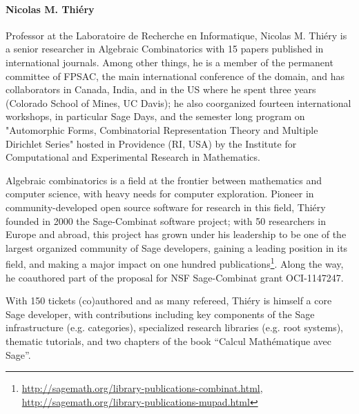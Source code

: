 \paragraph{Nicolas M. Thiéry}

Professor at the Laboratoire de Recherche en Informatique, Nicolas
M. Thiéry is a senior researcher in Algebraic Combinatorics with 15
papers published in international journals. Among other things, he is
a member of the permanent committee of FPSAC, the main international
conference of the domain, and has collaborators in Canada, India, and
in the US where he spent three years (Colorado School of Mines, UC
Davis); he also coorganized fourteen international workshops, in
particular Sage Days, and the semester long program on "Automorphic
Forms, Combinatorial Representation Theory and Multiple Dirichlet
Series" hosted in Providence (RI, USA) by the Institute for
Computational and Experimental Research in Mathematics.

Algebraic combinatorics is a field at the frontier between mathematics
and computer science, with heavy needs for computer
exploration. Pioneer in community-developed open source software for
research in this field, Thiéry founded in 2000 the Sage-Combinat
software project; with 50 researchers in Europe and abroad, this
project has grown under his leadership to be one of the largest
organized community of Sage developers, gaining a leading position in
its field, and making a major impact on one hundred
publications\footnote{\url{http://sagemath.org/library-publications-combinat.html},
\url{http://sagemath.org/library-publications-mupad.html}}. Along the
way,
he coauthored part of the proposal for NSF Sage-Combinat grant
OCI-1147247.

With 150 tickets (co)authored and as many refereed, Thiéry is himself
a core Sage developer, with contributions including key components of
the Sage infrastructure (e.g. categories), specialized research
libraries (e.g. root systems), thematic tutorials, and two chapters of
the book ``Calcul Mathématique avec Sage''.
